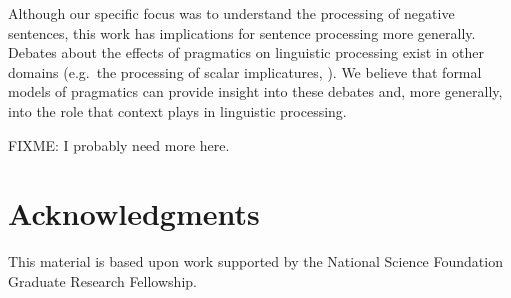 \documentclass[man]{apa2}
\begin{document}
Although our specific focus was to understand the processing of negative sentences, this work has implications for sentence processing more generally.  Debates about the effects of pragmatics on linguistic processing exist in other domains (e.g.\ the processing of scalar implicatures, ). We believe that formal models of pragmatics can provide insight into these debates and, more generally, into the role that context plays in linguistic processing. 

FIXME: I probably need more here.  

\section{Acknowledgments}
This material is based upon work supported by the National Science Foundation Graduate Research Fellowship. 




\setlength{\bibleftmargin}{.125in}
\setlength{\bibindent}{-\bibleftmargin}


\end{document}
